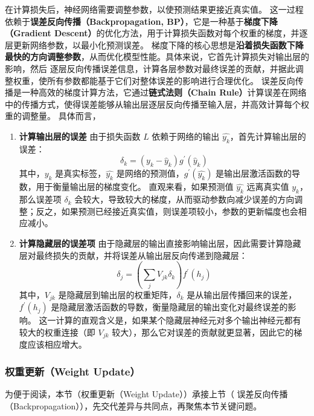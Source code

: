 在计算损失后，神经网络需要调整参数，以使预测结果更接近真实值。
这一过程依赖于{\bf 误差反向传播（Backpropagation, BP）}，它是一种基于{\bf 梯度下降（Gradient Descent）}的优化方法，用于计算损失函数对每个权重的梯度，并逐层更新网络参数，以最小化预测误差。
梯度下降的核心思想是{\bf 沿着损失函数下降最快的方向调整参数}，从而优化模型性能。具体来说，它首先计算损失对输出层的影响，然后 逐层反向传播误差信息，计算各层参数对最终误差的贡献，并据此调整权重，使所有参数都能基于它们对整体误差的影响进行合理优化。
误差反向传播是一种高效的梯度计算方法，它通过{\bf 链式法则（Chain Rule）}计算误差在网络中的传播方式，使得误差能够从输出层逐层反向传播至输入层，并高效计算每个权重的调整量。
具体而言，
\begin{enumerate}
\item {\bf  计算输出层的误差}
由于损失函数 $L$ 依赖于网络的输出 $\hat{y_k}$，首先计算输出层的误差：
$$
\delta_k = \left( y_k-\hat y_k \right)g^\prime(\hat y_k)
$$
其中，$y_k$ 是真实标签，$\hat{y_k}$ 是网络的预测值，$g^\prime(\hat{y_k})$ 是输出层激活函数的导数，用于衡量输出层的梯度变化。
直观来看，如果预测值 $\hat{y_k}$ 远离真实值 $y_k$，那么误差项 $\delta_k$ 会较大，导致较大的梯度，从而驱动参数向减少误差的方向调整；反之，如果预测已经接近真实值，则误差项较小，参数的更新幅度也会相应减小。
\item {\bf 计算隐藏层的误差项}
由于隐藏层的输出直接影响输出层，因此需要计算隐藏层对最终损失的贡献，并将误差从输出层反向传递到隐藏层：
$$
\delta_j = \left(\sum_j V_{jk} \delta_k  \right)f^\prime(h_j)
$$
其中，$V_{jk}$ 是隐藏层到输出层的权重矩阵，$\delta_k$ 是从输出层传播回来的误差，$f^\prime(h_j)$ 是隐藏层激活函数的导数，衡量隐藏层的输出变化对最终误差的影响。
这一计算的直观含义是，如果某个隐藏层神经元对多个输出神经元都有较大的权重连接（即 $V_{jk}$ 较大），那么它对误差的贡献就更显著，因此它的梯度应该相应增大。
\end{enumerate}
\subsubsection*{权重更新（Weight Update）}
为便于阅读，本节（权重更新（Weight Update））承接上节（ 误差反向传播（Backpropagation）），先交代差异与共同点，再聚焦本节关键问题。

